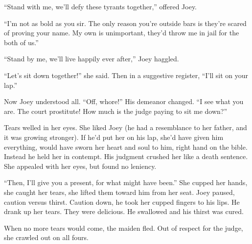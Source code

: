 \documentclass[oneside]{book}
\begin{document}
``Stand with me, we'll defy these tyrants together,'' offered Joey.

``I'm not as bold as you sir.  The only reason you're outside bars
is they're scared of proving your name.  My own is unimportant, they'd throw me in
jail for the both of us.''

``Stand by me, we'll live happily ever after,'' Joey haggled.

``Let's sit down together!'' she said.
Then in a suggestive register, ``I'll sit on your lap.''

Now Joey understood all.
``Off, whore!''  His demeanor changed.  ``I see what you are.
The court prostitute!  How much is the judge paying to sit me down?''

Tears welled in her eyes.
She liked Joey (he had a resemblance to her father, and it was growing stronger).
If he'd put her on his lap,
she'd have given him everything, would have sworn
her heart and soul to him, right hand on the bible.
Instead he held her in contempt.
His judgment crushed her like a death sentence.
She appealed with her eyes, but found no leniency.

``Then, I'll give you a present, for what might have been.''
She cupped her hands, she caught her tears, she lifted them toward him
from her seat.  Joey paused, caution versus thirst.
Caution down, he took her cupped fingers to his lips.
He drank up her tears.  They were delicious.  He swallowed and his thirst was cured.

When no more tears would come, the maiden fled.
Out of respect for the judge, she crawled out on all fours.
\end{document}
